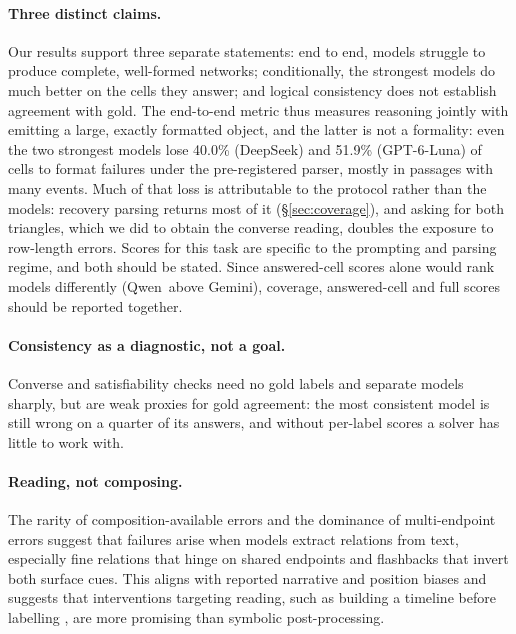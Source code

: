 \documentclass[11pt]{article}
\newcommand{\Ds}{DeepSeek}
\newcommand{\Gp}{GPT-6-Luna}
\newcommand{\Gm}{Gemini}
\newcommand{\Qw}{Qwen}
\begin{document}
\paragraph{Three distinct claims.}
Our results support three separate statements: end to end, models struggle to produce complete, well-formed networks; conditionally, the strongest models do much better on the cells they answer; and logical consistency does not establish agreement with gold. The end-to-end metric thus measures reasoning jointly with emitting a large, exactly formatted object, and the latter is not a formality: even the two strongest models lose 40.0\% (\Ds) and 51.9\% (\Gp) of cells to format failures under the pre-registered parser, mostly in passages with many events. Much of that loss is attributable to the protocol rather than the models: recovery parsing returns most of it (\S\ref{sec:coverage}), and asking for both triangles, which we did to obtain the converse reading, doubles the exposure to row-length errors. Scores for this task are specific to the prompting and parsing regime, and both should be stated. Since answered-cell scores alone would rank models differently (\Qw\ above \Gm), coverage, answered-cell and full scores should be reported together.

\paragraph{Consistency as a diagnostic, not a goal.}
Converse and satisfiability checks need no gold labels and separate models sharply, but are weak proxies for gold agreement: the most consistent model is still wrong on a quarter of its answers, and without per-label scores \citep{ning-etal-2017-structured,han-etal-2019-deep} a solver has little to work with.

\paragraph{Reading, not composing.}
The rarity of composition-available errors and the dominance of multi-endpoint errors suggest that failures arise when models extract relations from text, especially fine relations that hinge on shared endpoints and flashbacks that invert both surface cues. This aligns with reported narrative and position biases \citep{fang-etal-2024-getting,qiu-etal-2024-large} and suggests that interventions targeting reading, such as building a timeline before labelling \citep{zhang-etal-2024-narrative}, are more promising than symbolic post-processing.
\end{document}
